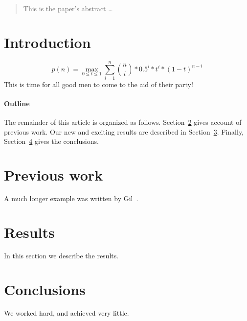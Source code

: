 \documentclass[12pt]{article}
\begin{document}
\maketitle

\begin{abstract}
This is the paper's abstract \ldots
\end{abstract}

\section{Introduction}
\begin{equation}
    p(n) = \max_{0 \leq t \leq 1} \sum_{i=1}^{n} {n \choose i} * 0.5 ^{i} * t^{i} * (1-t)^{n-i}
\end{equation}
This is time for all good men to come to the aid of their party!

\paragraph{Outline}
The remainder of this article is organized as follows.
Section~\ref{previous work} gives account of previous work.
Our new and exciting results are described in Section~\ref{results}.
Finally, Section~\ref{conclusions} gives the conclusions.

\section{Previous work}\label{previous work}
A much longer \LaTeXe{} example was written by Gil~\cite{Gil:02}.

\section{Results}\label{results}
In this section we describe the results.

\section{Conclusions}\label{conclusions}
We worked hard, and achieved very little.



\end{document}
